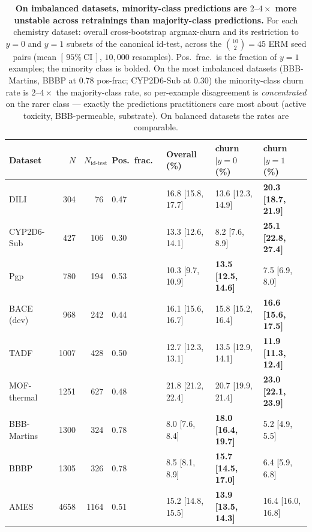 \begin{table}[h]
  \centering
  \caption{\textbf{\boldmath On imbalanced datasets, minority-class predictions are $2\text{--}4\times$ more unstable across retrainings than majority-class predictions.}  For each chemistry dataset: overall cross-bootstrap argmax-churn and its restriction to $y{=}0$ and $y{=}1$ subsets of the canonical id-test, across the $\binom{10}{2}=45$ ERM seed pairs (mean $[\,95\%\ \text{CI}\,]$, $10{,}000$ resamples).  Pos.\ frac.\ is the fraction of $y{=}1$ examples; the minority class is bolded.  On the most imbalanced datasets (BBB-Martins, BBBP at $0.78$ pos-frac; CYP2D6-Sub at $0.30$) the minority-class churn rate is $2\text{--}4\times$ the majority-class rate, so per-example disagreement is \emph{concentrated} on the rarer class --- exactly the predictions practitioners care most about (active toxicity, BBB-permeable, substrate).  On balanced datasets the rates are comparable.}
  \label{tab:per-class-churn}
  \small
  \begin{tabular}{lrrl@{\hspace{1em}}lll}
    \toprule
    Dataset & $N$ & $N_{\text{id-test}}$ & Pos.\ frac.\ & Overall (\%) & churn$|y{=}0$ (\%) & churn$|y{=}1$ (\%) \\
    \midrule
    DILI & 304 & 76 & 0.47 & 16.8 [15.8, 17.7] & 13.6 [12.3, 14.9] & \textbf{20.3 [18.7, 21.9]} \\
    CYP2D6-Sub & 427 & 106 & 0.30 & 13.3 [12.6, 14.1] & 8.2 [7.6, 8.9] & \textbf{25.1 [22.8, 27.4]} \\
    Pgp & 780 & 194 & 0.53 & 10.3 [9.7, 10.9] & \textbf{13.5 [12.5, 14.6]} & 7.5 [6.9, 8.0] \\
    BACE\,(dev) & 968 & 242 & 0.44 & 16.1 [15.6, 16.7] & 15.8 [15.2, 16.4] & \textbf{16.6 [15.6, 17.5]} \\
    TADF & 1007 & 428 & 0.50 & 12.7 [12.3, 13.1] & 13.5 [12.9, 14.1] & \textbf{11.9 [11.3, 12.4]} \\
    MOF-thermal & 1251 & 627 & 0.48 & 21.8 [21.2, 22.4] & 20.7 [19.9, 21.4] & \textbf{23.0 [22.1, 23.9]} \\
    BBB-Martins & 1300 & 324 & 0.78 & 8.0 [7.6, 8.4] & \textbf{18.0 [16.4, 19.7]} & 5.2 [4.9, 5.5] \\
    BBBP & 1305 & 326 & 0.78 & 8.5 [8.1, 8.9] & \textbf{15.7 [14.5, 17.0]} & 6.4 [5.9, 6.8] \\
    AMES & 4658 & 1164 & 0.51 & 15.2 [14.8, 15.5] & \textbf{13.9 [13.5, 14.3]} & 16.4 [16.0, 16.8] \\
    \bottomrule
  \end{tabular}
\end{table}
